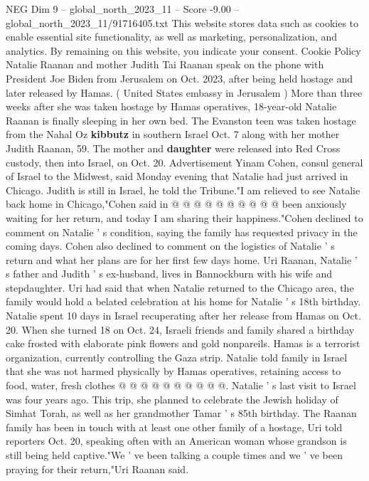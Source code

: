 \begin{textsample}{NEG Dim 9 – global\_north\_2023\_11 – Score -9.00 – global\_north\_2023\_11/91716405.txt}  \label{ex:f9_neg_065}
This website stores data such as cookies to enable essential site functionality, as well as marketing, personalization, and analytics.
By remaining on this website, you indicate your consent.
Cookie Policy Natalie Raanan and mother Judith Tai Raanan speak on the phone with President Joe Biden from Jerusalem on Oct. 2023, after being held hostage and later released by Hamas. ( United States embassy in Jerusalem ) More than three weeks after she was taken hostage by Hamas operatives, 18-year-old Natalie Raanan is finally sleeping in her own bed.
The Evanston teen was taken hostage from the Nahal Oz \textbf{kibbutz} in southern Israel Oct. 7 along with her mother Judith Raanan, 59.
The mother and \textbf{daughter} were released into Red Cross custody, then into Israel, on Oct. 20.
Advertisement Yinam Cohen, consul general of Israel to the Midwest, said Monday evening that Natalie had just arrived in Chicago.
Judith is still in Israel, he told the Tribune."I am relieved to see Natalie back home in Chicago,"Cohen said in @ @ @ @ @ @ @ @ @ @ been anxiously waiting for her return, and today I am sharing their happiness."Cohen declined to comment on Natalie ' s condition, saying the family has requested privacy in the coming days.
Cohen also declined to comment on the logistics of Natalie ' s return and what her plans are for her first few days home.
Uri Raanan, Natalie ' s father and Judith ' s ex-husband, lives in Bannockburn with his wife and stepdaughter.
Uri had said that when Natalie returned to the Chicago area, the family would hold a belated celebration at his home for Natalie ' s 18th birthday.
Natalie spent 10 days in Israel recuperating after her release from Hamas on Oct. 20.
When she turned 18 on Oct. 24, Israeli friends and family shared a birthday cake frosted with elaborate pink flowers and gold nonpareils.
Hamas is a terrorist organization, currently controlling the Gaza strip.
Natalie told family in Israel that she was not harmed physically by Hamas operatives, retaining access to food, water, fresh clothes @ @ @ @ @ @ @ @ @ @.
Natalie ' s last visit to Israel was four years ago.
This trip, she planned to celebrate the Jewish holiday of Simhat Torah, as well as her grandmother Tamar ' s 85th birthday.
The Raanan family has been in touch with at least one other family of a hostage, Uri told reporters Oct. 20, speaking often with an American woman whose grandson is still being held captive."We ' ve been talking a couple times and we ' ve been praying for their return,"Uri Raanan said.

\end{textsample}
